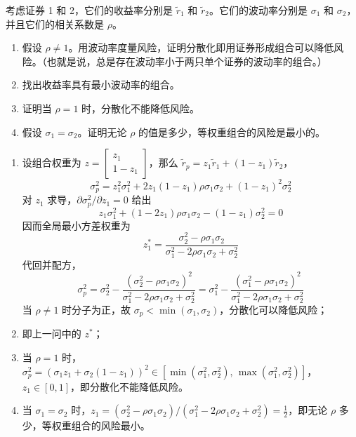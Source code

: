 \begin{problem}
 考虑证券 1 和 2，它们的收益率分别是 $\tilde{r}_{1}$ 和 $\tilde{r}_{2}$。它们的波动率分别是 $\sigma_{1}$ 和 $\sigma_{2}$，并且它们的相关系数是 $\rho$。
\begin{enumerate}[label=(\alph*)]
    \item 假设 $\rho\ne 1$。用波动率度量风险，证明分散化即用证券形成组合可以降低风险。（也就是说，总是存在波动率小于两只单个证券的波动率的组合。）
    \item 找出收益率具有最小波动率的组合。
    \item 证明当 $\rho=1$ 时，分散化不能降低风险。
    \item 假设 $\sigma_{1}=\sigma_{2}$。证明无论 $\rho$ 的值是多少，等权重组合的风险是最小的。
\end{enumerate}
\end{problem}
\begin{solution}
\begin{enumerate}[label=(\alph*)]
    \item 设组合权重为 $z=\begin{bmatrix}z_{1} \\ 1-z_{1}\end{bmatrix}$，那么 $\tilde{r}_{p}=z_{1}\tilde{r}_{1}+(1-z_{1})\tilde{r}_{2}$，
    \[
        \sigma_{p}^{2}=z_{1}^{2}\sigma_{1}^{2}+2z_{1}(1-z_{1})\rho\sigma_{1}\sigma_{2}+(1-z_{1})^{2}\sigma_{2}^{2}
    \]
    对 $z_{1}$ 求导，$\partial\sigma_{p}^{2}/\partial z_{1}=0$ 给出
    \[
        z_{1}\sigma_{1}^{2}+(1-2z_{1})\rho\sigma_{1}\sigma_{2}-(1-z_{1})\sigma_{2}^{2}=0
    \]
    因而全局最小方差权重为
    \[
        z_{1}^{*}=\frac{\sigma_{2}^{2}-\rho\sigma_{1}\sigma_{2}}{\sigma_{1}^{2}-2\rho\sigma_{1}\sigma_{2}+\sigma_{2}^{2}}
    \]
    代回并配方，
    \[
        \sigma_{p}^{2}=\sigma_{2}^{2}-\frac{(\sigma_{2}^{2}-\rho\sigma_{1}\sigma_{2})^{2}}{\sigma_{1}^{2}-2\rho\sigma_{1}\sigma_{2}+\sigma_{2}^{2}}=\sigma_{1}^{2}-\frac{(\sigma_{1}^{2}-\rho\sigma_{1}\sigma_{2})^{2}}{\sigma_{1}^{2}-2\rho\sigma_{1}\sigma_{2}+\sigma_{2}^{2}}
    \]
    当 $\rho\ne 1$ 时分子为正，故 $\sigma_{p}<\min(\sigma_{1},\sigma_{2})$，分散化可以降低风险；
    \item 即上一问中的 $z^{*}$；
    \item 当 $\rho=1$ 时，$\sigma_{p}^{2}=(\sigma_{1}z_{1}+\sigma_{2}(1-z_{1}))^{2}\in[\min(\sigma_{1}^{2},\sigma_{2}^{2}),\,\max(\sigma_{1}^{2},\sigma_{2}^{2})]$，$z_{1}\in[0,1]$，即分散化不能降低风险。
    \item 当 $\sigma_{1}=\sigma_{2}$ 时，$z_{1}=(\sigma_{2}^{2}-\rho\sigma_{1}\sigma_{2})/(\sigma_{1}^{2}-2\rho\sigma_{1}\sigma_{2}+\sigma_{2}^{2})=\tfrac12$，即无论 $\rho$ 多少，等权重组合的风险最小。
\end{enumerate}
\end{solution}

